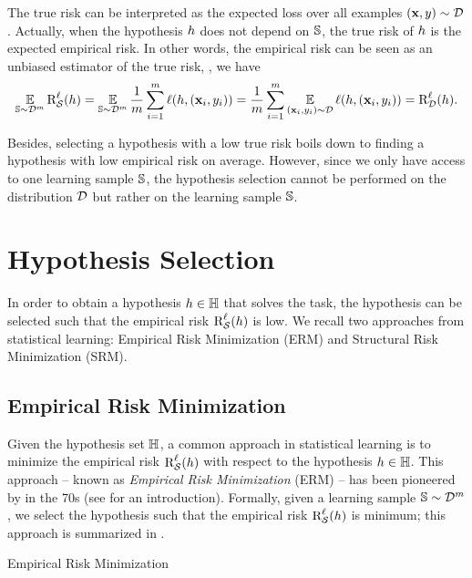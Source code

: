 The true risk can be interpreted as the expected loss over all examples $(\x,\y)\sim\D$.
Actually, when the hypothesis $\h$ does not depend on $\S$, the true risk of $\h$ is the expected empirical risk.
In other words, the empirical risk can be seen as an unbiased estimator of the true risk, \ie, we have
\begin{align*}
    \EE_{\S\sim\D^\m}\RiskLoss_{\dS}(\h)=\EE_{\S\sim\D^\m}\frac{1}{\m}\sum_{i=1}^{\m}\loss(\h, (\x_i,\y_i))=\frac{1}{\m}\sum_{i=1}^{\m}\EE_{(\x_i,\y_i)\sim\D}\loss(\h, (\x_i,\y_i))=\RiskLoss_{\D}(\h).
\end{align*}

Besides, selecting a hypothesis with a low true risk boils down to finding a hypothesis with low empirical risk on average.
However, since we only have access to one learning sample $\S$, the hypothesis selection cannot be performed on the distribution $\D$ but rather on the learning sample $\S$.

\section{Hypothesis Selection}
\label{chap:intro:sec:selection}

In order to obtain a hypothesis $\h\in\H$ that solves the task, the hypothesis can be selected such that the empirical risk $\RiskLoss_{\dS}(\h)$ is low.
We recall two approaches from statistical learning: Empirical Risk Minimization (ERM) and Structural Risk Minimization (SRM). 

\subsection{Empirical Risk Minimization}

Given the hypothesis set $\H$, a common approach in statistical learning is to minimize the empirical risk $\RiskLoss_{\dS}(\h)$ with respect to the hypothesis $\h\in\H$. 
This approach -- known as {\it Empirical Risk Minimization} (ERM) -- has been pioneered by \citet{VapnikChervonenkis1968,VapnikChervonenkis1971,VapnikChervonenkis1974} in the 70s (see \citet{Vapnik1998} for an introduction).
Formally, given a learning sample $\S\sim\D^\m$, we select the hypothesis such that the empirical risk $\RiskLoss_{\dS}(\h)$ is minimum; this approach is summarized in .

\begin{algorithm}[H]
  \caption{Empirical Risk Minimization}
  \begin{algorithmic}
    \\
\end{algorithmic}
\label{chap:intro:algo:erm}
\end{algorithm}


